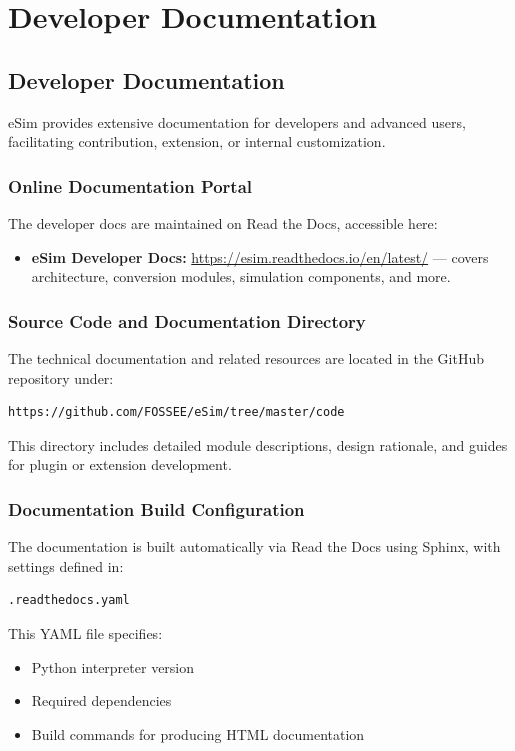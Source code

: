 \chapter{Developer Documentation}
\thispagestyle{empty}
\label{chap15}
\section{Developer Documentation}

eSim provides extensive documentation for developers and advanced users, facilitating contribution, extension, or internal customization.

\subsection{Online Documentation Portal}
The developer docs are maintained on Read the Docs, accessible here:
\begin{itemize}
  \item \textbf{eSim Developer Docs:} \url{https://esim.readthedocs.io/en/latest/} — covers architecture, conversion modules, simulation components, and more.
\end{itemize}

\subsection{Source Code and Documentation Directory}
The technical documentation and related resources are located in the GitHub repository under:
\begin{verbatim}
https://github.com/FOSSEE/eSim/tree/master/code
\end{verbatim}
This directory includes detailed module descriptions, design rationale, and guides for plugin or extension development. 

\subsection{Documentation Build Configuration}
The documentation is built automatically via Read the Docs using Sphinx, with settings defined in:
\begin{verbatim}
.readthedocs.yaml
\end{verbatim}
This YAML file specifies:
\begin{itemize}
  \item Python interpreter version
  \item Required dependencies
  \item Build commands for producing HTML documentation
\end{itemize}


